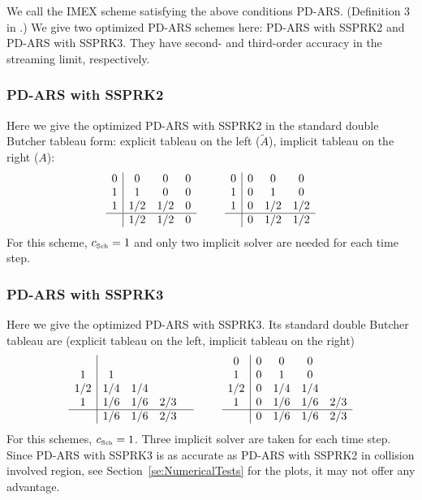 We call the IMEX scheme satisfying the above conditions {PD-ARS}. (Definition 3 in \cite{chu_etal_2018}.)
We give two optimized PD-ARS schemes here: PD-ARS with SSPRK2 and  PD-ARS with SSPRK3. 
They have second- and third-order accuracy in the streaming limit, respectively.
\subsubsection{PD-ARS with SSPRK2}
Here we give the optimized PD-ARS with SSPRK2 in the standard double Butcher tableau form: explicit tableau on the left ($\tilde{A}$), implicit tableau on the right ($A$):
\begin{equation}
  \begin{array}{c | c c c}
  	0 & 0   & 0 & 0 \\
  	1 & 1   & 0 & 0 \\
  	1 & 1/2 & 1/2 & 0 \\ \hline
  	  & 1/2 & 1/2 & 0
  \end{array}
  \qquad
  \begin{array}{c | c c c}
  	0 & 0 & 0            & 0            \\
  	1 & 0 & 1            & 0            \\
  	1 & 0 & 1/2 & 1/2 \\ \hline
  	  & 0 & 1/2 & 1/2
  \end{array}
\end{equation}
For this scheme, $c_{\mbox{\tiny Sch}}= 1$ and only two implicit solver are needed for each time step.
\subsubsection{PD-ARS with SSPRK3}
Here we give the optimized PD-ARS with SSPRK3.
Its standard double Butcher tableau are (explicit tableau on the left, implicit tableau on the right)
\begin{equation}
  \begin{array}{c | c c c c}
  	    &     &     &     &  \\
  	 1  & 1   &     &     &  \\
  	1/2 & 1/4 & 1/4 &  \\
  	 1  & 1/6 & 1/6 & 2/3 &  \\ \hline
  	    & 1/6 & 1/6 & 2/3 &
  \end{array}
  \qquad
  \begin{array}{c | c c c c}
  	0 & 0 & 0            & 0            \\
  	1 & 0 & 1            & 0            \\
  	1/2 & 0 & 1/4 & 1/4 \\ 
  	1 & 0 & 1/6 & 1/6 & 2/3\\\hline
  	  & 0 & 1/6 & 1/6 & 2/3
  \end{array}
\end{equation}
For this schemes, $c_{\mbox{\tiny Sch}}= 1$.
Three implicit solver are taken for each time step.
Since PD-ARS with SSPRK3 is as accurate as PD-ARS with SSPRK2 in collision involved region, see Section~\ref{se:NumericalTests} for the plots, it may not offer any advantage.